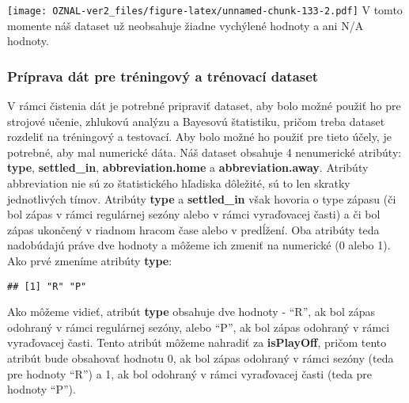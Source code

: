 \documentclass[
]{article}
\newenvironment{Shaded}{\begin{snugshade}}{\end{snugshade}}
\newcommand{\DecValTok}[1]{\textcolor[rgb]{0.00,0.00,0.81}{#1}}
\newcommand{\FunctionTok}[1]{\textcolor[rgb]{0.00,0.00,0.00}{#1}}
\newcommand{\NormalTok}[1]{#1}
\newcommand{\OtherTok}[1]{\textcolor[rgb]{0.56,0.35,0.01}{#1}}
\newcommand{\SpecialCharTok}[1]{\textcolor[rgb]{0.00,0.00,0.00}{#1}}
\newcommand{\StringTok}[1]{\textcolor[rgb]{0.31,0.60,0.02}{#1}}
\begin{document}
\texttt{[image: OZNAL-ver2\_files/figure-latex/unnamed-chunk-133-2.pdf]}
V tomto momente náš dataset už neobsahuje žiadne vychýlené hodnoty a ani
N/A hodnoty.

\hypertarget{pruxedprava-duxe1t-pre-truxe9ningovuxfd-a-truxe9novacuxed-dataset}{%
\subsubsection{Príprava dát pre tréningový a trénovací
dataset}\label{pruxedprava-duxe1t-pre-truxe9ningovuxfd-a-truxe9novacuxed-dataset}}

V rámci čistenia dát je potrebné pripraviť dataset, aby bolo možné
použiť ho pre strojové učenie, zhlukovú analýzu a Bayesovú štatistiku,
pričom treba dataset rozdeliť na tréningový a testovací. Aby bolo možné
ho použiť pre tieto účely, je potrebné, aby mal numerické dáta. Náš
dataset obsahuje 4 nenumerické atribúty: \textbf{type},
\textbf{settled\_in}, \textbf{abbreviation.home} a
\textbf{abbreviation.away}. Atribúty abbreviation nie sú zo
štatistického hľadiska dôležité, sú to len skratky jednotlivých tímov.
Atribúty \textbf{type} a \textbf{settled\_in} však hovoria o type zápasu
(či bol zápas v rámci regulárnej sezóny alebo v rámci vyraďovacej časti)
a či bol zápas ukončený v riadnom hracom čase alebo v predĺžení. Oba
atribúty teda nadobúdajú práve dve hodnoty a môžeme ich zmeniť na
numerické (0 alebo 1). Ako prvé zmeníme atribúty \textbf{type}:

\begin{Shaded}
\end{Shaded}

\begin{verbatim}
## [1] "R" "P"
\end{verbatim}

Ako môžeme vidieť, atribút \textbf{type} obsahuje dve hodnoty - ``R'',
ak bol zápas odohraný v rámci regulárnej sezóny, alebo ``P'', ak bol
zápas odohraný v rámci vyraďovacej časti. Tento atribút môžeme nahradiť
za \textbf{isPlayOff}, pričom tento atribút bude obsahovať hodnotu 0, ak
bol zápas odohraný v rámci sezóny (teda pre hodnoty ``R'') a 1, ak bol
odohraný v rámci vyraďovacej časti (teda pre hodnoty ``P'').

\begin{Shaded}
\end{Shaded}
\end{document}

